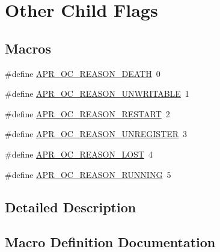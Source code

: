 \hypertarget{group___a_p_r___o_c}{}\section{Other Child Flags}
\label{group___a_p_r___o_c}
\subsection*{Macros}
\begin{DoxyCompactItemize}
\item 
\#define \hyperlink{group___a_p_r___o_c_ga93a18b17cfedca0c7c99c696508c935b}{A\+P\+R\+\_\+\+O\+C\+\_\+\+R\+E\+A\+S\+O\+N\+\_\+\+D\+E\+A\+TH}~0
\item 
\#define \hyperlink{group___a_p_r___o_c_gae4cb4983512df7df00c9c0401efba9c9}{A\+P\+R\+\_\+\+O\+C\+\_\+\+R\+E\+A\+S\+O\+N\+\_\+\+U\+N\+W\+R\+I\+T\+A\+B\+LE}~1
\item 
\#define \hyperlink{group___a_p_r___o_c_ga5ae054b0b4c7c8eea911c146ae9ccdce}{A\+P\+R\+\_\+\+O\+C\+\_\+\+R\+E\+A\+S\+O\+N\+\_\+\+R\+E\+S\+T\+A\+RT}~2
\item 
\#define \hyperlink{group___a_p_r___o_c_ga7fe88662b788e07800290f68575b2f4b}{A\+P\+R\+\_\+\+O\+C\+\_\+\+R\+E\+A\+S\+O\+N\+\_\+\+U\+N\+R\+E\+G\+I\+S\+T\+ER}~3
\item 
\#define \hyperlink{group___a_p_r___o_c_ga5d441798b20b93bd1f609264d03690fb}{A\+P\+R\+\_\+\+O\+C\+\_\+\+R\+E\+A\+S\+O\+N\+\_\+\+L\+O\+ST}~4
\item 
\#define \hyperlink{group___a_p_r___o_c_gaa4a7ca44f23d67e7e19fd59bf41abd6a}{A\+P\+R\+\_\+\+O\+C\+\_\+\+R\+E\+A\+S\+O\+N\+\_\+\+R\+U\+N\+N\+I\+NG}~5
\end{DoxyCompactItemize}


\subsection{Detailed Description}


\subsection{Macro Definition Documentation}
